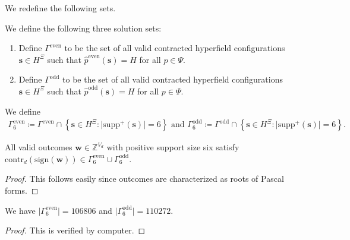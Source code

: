 We redefine the following sets.

\begin{definition}
    We define the following three solution sets:
    \begin{enumerate}
        \item     Define \( \Gamma^{\mathrm{even}} \) to be the set of all valid contracted hyperfield configurations \( \mathbf{s} \in H^{\Xi} \) such that \( \hat p^{\mathrm{even}}(\mathbf{s}) = H \) for all \( p \in \Psi \).

        \item     Define \( \Gamma^{\mathrm{odd}} \) to be the set of all valid contracted hyperfield configurations \( \mathbf{s} \in H^{\Xi} \) such that \( \hat p^{\mathrm{odd}}(\mathbf{s}) = H \) for all \( p \in \Psi \).
    \end{enumerate}
\end{definition}

\begin{definition}
    We define 
    \begin{gather*}
        \Gamma^{\mathrm{even}}_6 \coloneqq \Gamma^{\mathrm{even}} \cap \left\{ \mathbf{s} \in H^{\Xi} : \lvert \mathrm{supp}^+(\mathbf{s}) \rvert = 6 \right\}
        \text{ and }
        \Gamma^{\mathrm{odd}}_6 \coloneqq \Gamma^{\mathrm{odd}} \cap \left\{ \mathbf{s} \in H^{\Xi} : \lvert \mathrm{supp}^+(\mathbf{s}) \rvert = 6 \right\}.
    \end{gather*}
\end{definition}

\begin{proposition}
    All valid outcomes \( \mathbf{w} \in \mathbb{Z}^{V_d} \) with positive support size six satisfy \( \mathrm{contr}_d(\mathrm{sign}(\mathbf{w})) \in \Gamma^{\mathrm{even}}_6 \cup \Gamma^{\mathrm{odd}}_6 \).
\end{proposition}

\begin{proof}
    This follows easily since outcomes are characterized as roots of Pascal forms.
\end{proof}

\begin{proposition}
    We have \( \lvert \Gamma^{\mathrm{even}}_6 \rvert  = 106806\) and \( \lvert \Gamma^{\mathrm{odd}}_6 \rvert  = 110272\).
\end{proposition}

\begin{proof}
    This is verified by computer.
\end{proof}

